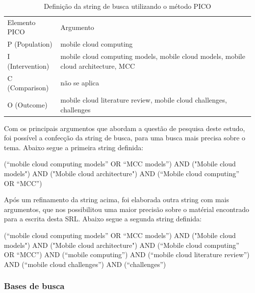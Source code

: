 \documentclass[12pt]{article}
\begin{document}
\begin{table}[h]
  \centering
  {\renewcommand\arraystretch{1.25}
  \begin{tabular}{ l l }
    \cline{1-1}\cline{2-2}  
    \multicolumn{1}{|p{5cm}|}{Elemento PICO} &
    \multicolumn{1}{p{8cm}|}{Argumento}
    \\  
    \cline{1-1}\cline{2-2}  
    \multicolumn{1}{|p{5cm}|}{P (Population)} &
    \multicolumn{1}{p{8cm}|}{mobile cloud computing}
    \\  
    \cline{1-1}\cline{2-2}  
    \multicolumn{1}{|p{5cm}|}{I (Intervention)} &
    \multicolumn{1}{p{8cm}|}{mobile cloud computing models, mobile cloud models, mobile cloud architecture, MCC}
    \\  
    \cline{1-1}\cline{2-2}  
    \multicolumn{1}{|p{5cm}|}{C (Comparison)} &
    \multicolumn{1}{p{8cm}|}{não se aplica}
    \\  
    \cline{1-1}\cline{2-2}  
    \multicolumn{1}{|p{5cm}|}{O (Outcome)} &
    \multicolumn{1}{p{8cm}|}{mobile cloud literature review, mobile cloud challenges, challenges}
    \\  
    \hline
  \end{tabular} }
  \caption{Definição da string de busca utilizando o método PICO} 
  \label{pico} 
  
\end{table}

Com os principais argumentos que abordam a questão de pesquisa deste estudo, foi possível a confecção da string de busca,
para uma busca mais precisa sobre o tema. Abaixo segue a primeira string definida:

(“mobile cloud computing models” OR “MCC models”) AND ("Mobile cloud models") AND ("Mobile cloud architecture") AND (“Mobile
cloud computing” OR “MCC”)

Após um refinamento da string acima, foi elaborada outra string com mais argumentos, que nos possibilitou uma maior precisão
sobre o matérial encontrado
para a escrita desta SRL. Abaixo segue a segunda string definida:

(“mobile cloud computing models” OR “MCC models”) AND ("Mobile cloud models") AND ("Mobile cloud architecture") AND (“Mobile
cloud computing” OR “MCC”) AND (“mobile computing”) AND (“mobile cloud literature review”) AND (“mobile cloud challenges”) AND
(“challenges”)

\subsubsection{Bases de busca}
\end{document}
